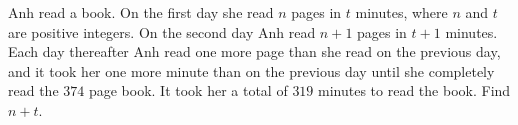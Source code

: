 Anh read a book. On the first day she read $n$ pages in $t$ minutes, where $n$ and $t$ are positive integers. On the second day Anh read $n + 1$ pages in $t + 1$ minutes. Each day thereafter Anh read one more page than she read on the previous day, and it took her one more minute than on the previous day until she completely read the $374$ page book. It took her a total of $319$ minutes to read the book. Find $n + t$.